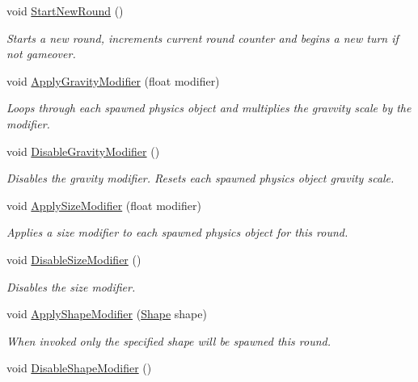 \begin{DoxyCompactItemize}
void \hyperlink{class_multi_stack_1_1_turn_manager_ae7cb8bf242a4c9cc7285be6aa8d3efb8}{Start\+New\+Round} ()
\begin{DoxyCompactList}\small\item\em Starts a new round, increments current round counter and begins a new turn if not gameover. \end{DoxyCompactList}\item 
void \hyperlink{class_multi_stack_1_1_turn_manager_af375fbee3096867b8337e75b8e4a06de}{Apply\+Gravity\+Modifier} (float modifier)
\begin{DoxyCompactList}\small\item\em Loops through each spawned physics object and multiplies the gravvity scale by the modifier. \end{DoxyCompactList}\item 
void \hyperlink{class_multi_stack_1_1_turn_manager_a4e0f7de949f3cb912cdbe98a195dcd04}{Disable\+Gravity\+Modifier} ()
\begin{DoxyCompactList}\small\item\em Disables the gravity modifier. Resets each spawned physics object gravity scale. \end{DoxyCompactList}\item 
void \hyperlink{class_multi_stack_1_1_turn_manager_aaaf4f4aa21ffbbb776f8aaa779cf132f}{Apply\+Size\+Modifier} (float modifier)
\begin{DoxyCompactList}\small\item\em Applies a size modifier to each spawned physics object for this round. \end{DoxyCompactList}\item 
void \hyperlink{class_multi_stack_1_1_turn_manager_a8755e3ed0f28537cea3ae261ec9521d1}{Disable\+Size\+Modifier} ()
\begin{DoxyCompactList}\small\item\em Disables the size modifier. \end{DoxyCompactList}\item 
void \hyperlink{class_multi_stack_1_1_turn_manager_ad1754c98a2d10824c3a0b17928e49f82}{Apply\+Shape\+Modifier} (\hyperlink{namespace_multi_stack_ac7f637887fea673ceeae6fdd0598c048}{Shape} shape)
\begin{DoxyCompactList}\small\item\em When invoked only the specified shape will be spawned this round. \end{DoxyCompactList}\item 
void \hyperlink{class_multi_stack_1_1_turn_manager_a6e51d749d36ac99a6c83abe227f44160}{Disable\+Shape\+Modifier} ()

\end{DoxyCompactItemize}
